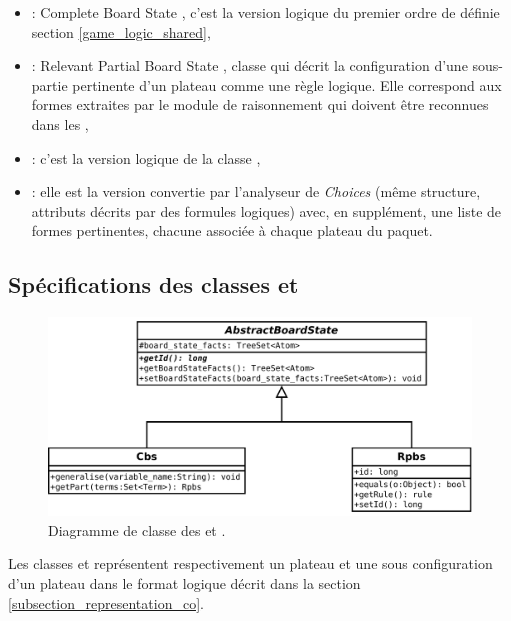\begin{itemize}
  \item \textbf{} : \og Complete Board State \fg{}, c'est la version logique du premier ordre de  définie section \vref{game_logic_shared},
  
  \item \textbf{} : \og Relevant Partial Board State \fg{}, classe qui décrit la configuration d'une sous-partie pertinente d'un plateau comme une règle logique. Elle correspond aux \og formes \fg{} extraites par le module de raisonnement qui doivent être reconnues dans les ,
  
   \item \textbf{} : c'est la version logique de la classe ,
   
   \item \textbf{} : elle est la version convertie par l'analyseur de \emph{Choices} (même structure, attributs décrits par des formules logiques) avec, en supplément, une liste de formes pertinentes, chacune associée à chaque plateau du paquet.
\end{itemize}


\subsection{Spécifications des classes  et }
\label{subsection_cbs_rpbs}

\begin{figure}[H] 
\centering
    \includegraphics[width=\textwidth]{files/class_diagram/rpbs_cbs} 
\caption{Diagramme de classe des  et .} 
\label{img_diag_class_board_state}
\end{figure}

Les classes  et  représentent respectivement un plateau et une sous configuration d'un plateau dans le format logique décrit dans la section \vref{subsection_representation_co}. 